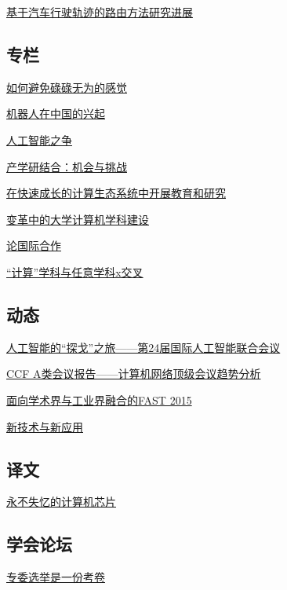 \documentclass[a4paper]{article}
\begin{document}
\href{http://history.ccf.org.cn/resources/1190201776262/2015/09/14/6.pdf}{基于汽车行驶轨迹的路由方法研究进展}

\subsection{专栏}
\href{http://history.ccf.org.cn/resources/1190201776262/2015/09/14/13.pdf}{如何避免碌碌无为的感觉}

\href{http://history.ccf.org.cn/resources/1190201776262/2015/09/14/10.pdf}{机器人在中国的兴起}

\href{http://history.ccf.org.cn/resources/1190201776262/2015/09/14/14.pdf}{人工智能之争}

\href{http://history.ccf.org.cn/resources/1190201776262/2015/09/14/11.pdf}{产学研结合：机会与挑战}

\href{http://history.ccf.org.cn/resources/1190201776262/2015/09/14/9.pdf}{在快速成长的计算生态系统中开展教育和研究}

\href{http://history.ccf.org.cn/resources/1190201776262/2015/09/14/7.pdf}{变革中的大学计算机学科建设}

\href{http://history.ccf.org.cn/resources/1190201776262/2015/09/14/12.pdf}{论国际合作}

\href{http://history.ccf.org.cn/resources/1190201776262/2015/09/14/8.pdf}{“计算”学科与任意学科x交叉}

\subsection{动态}
\href{http://history.ccf.org.cn/resources/1190201776262/2015/09/14/16.pdf}{人工智能的“探戈”之旅——第24届国际人工智能联合会议}

\href{http://history.ccf.org.cn/resources/1190201776262/2015/09/14/15.pdf}{CCF A类会议报告——计算机网络顶级会议趋势分析}

\href{http://history.ccf.org.cn/resources/1190201776262/2015/09/14/17.pdf}{面向学术界与工业界融合的FAST 2015}

\href{http://history.ccf.org.cn/resources/1190201776262/2015/09/14/18.pdf}{新技术与新应用}

\subsection{译文}
\href{http://history.ccf.org.cn/resources/1190201776262/2015/09/14/19.pdf}{永不失忆的计算机芯片}

\subsection{学会论坛}
\href{http://history.ccf.org.cn/resources/1190201776262/2015/09/14/20.pdf}{专委选举是一份考卷}
\end{document}
